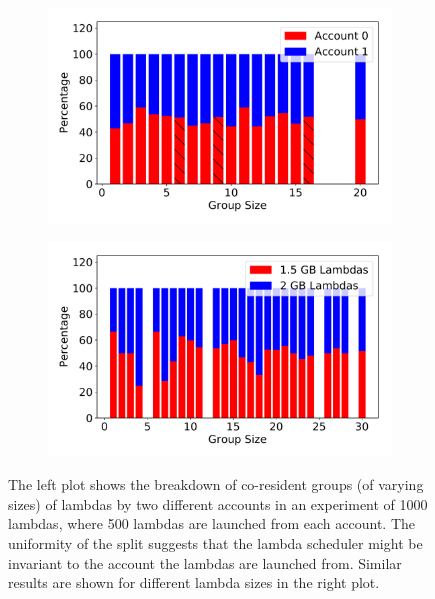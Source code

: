 \begin{figure}[!t]
  \begin{subfigure}{.5\textwidth}
    \centering
    \includegraphics[width=.99\linewidth]{fig/different-accounts.pdf}
  \end{subfigure}%
  \begin{subfigure}{.5\textwidth}
    \centering
    \includegraphics[width=.99\linewidth]{fig/different-sizes.pdf}
  \end{subfigure}

  \caption{The left plot shows the breakdown of co-resident groups (of varying
  sizes) of lambdas by two different accounts in an experiment of 1000
  lambdas, where 500 lambdas are launched from each account. The uniformity of
  the split suggests that the lambda scheduler might be invariant to the
  account the lambdas are launched from. Similar results are shown for
  different lambda sizes in the right plot. }
  \label{fig:factors}
\end{figure}


